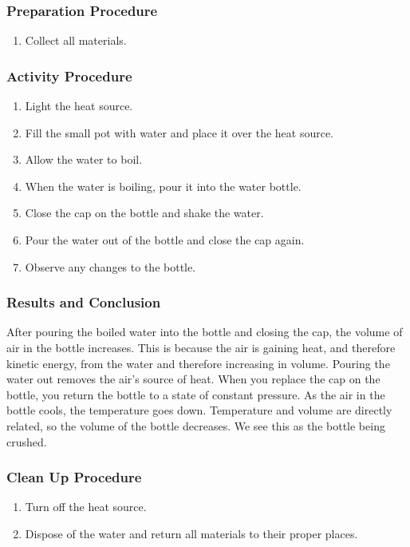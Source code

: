 \subsubsection*{Preparation Procedure}
\begin{enumerate}
\item{Collect all materials.} 
\end{enumerate}

\subsubsection*{Activity Procedure}
\begin{enumerate}
\item{Light the heat source.} 
\item{Fill the small pot with water and place it over the heat source.} 
\item{Allow the water to boil.} 
\item{When the water is boiling, pour it into the water bottle.} 
\item{Close the cap on the bottle and shake the water.} 
\item{Pour the water out of the bottle and close the cap again.} 
\item{Observe any changes to the bottle.} 
\end{enumerate}

\subsubsection*{Results and Conclusion}
After pouring the boiled water into the bottle and closing the cap, the volume of air in the bottle increases.  This is because the air is gaining heat, and therefore kinetic energy, from the water and therefore increasing in volume.  Pouring the water out removes the air's source of heat.  When you replace the cap on the bottle, you return the bottle to a state of constant pressure.  As the air in the bottle cools, the temperature goes down.  Temperature and volume are directly related, so the volume of the bottle decreases.  We see this as the bottle being crushed.

\subsubsection*{Clean Up Procedure}
\begin{enumerate}
\item{Turn off the heat source.} 
\item{Dispose of the water and return all materials to their proper places.} 
\end{enumerate}

